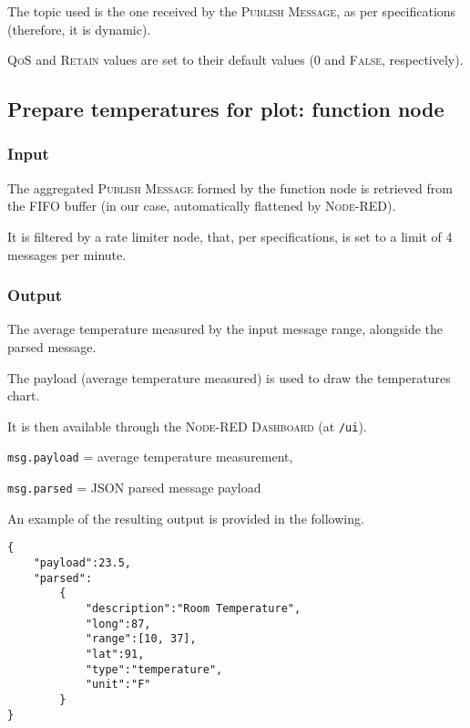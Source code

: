 \documentclass[a4paper,11pt]{article} %
\begin{document}
    The topic used is the one received by the \textsc{Publish Message}, as per specifications (therefore, it is dynamic).

    \smallskip

    \textsc{QoS} and \textsc{Retain} values are set to their default values (\textsc{0} and \textsc{False}, respectively).

    \subsection{Prepare temperatures for plot: function node}\label{subsec:prepare-temperatures-for-plot:-function-node}

    \subsubsection{Input}

    The aggregated \textsc{Publish Message} formed by the function node is retrieved from the FIFO buffer (in our case, automatically flattened by \textsc{Node-RED}).

    \smallskip

    It is filtered by a rate limiter node, that, per specifications, is set to a limit of 4 messages per minute.

    \subsubsection{Output}

    The average temperature measured by the input message range, alongside the parsed message.

    \smallskip

    The payload (average temperature measured) is used to draw the temperatures chart.

    \smallskip

    It is then available through the \textsc{Node-RED Dashboard} (at \texttt{/ui}).

    \smallskip

    \texttt{msg.payload} = average temperature measurement,

    \texttt{msg.parsed} = JSON parsed message payload

    \medskip

    An example of the resulting output is provided in the following.

    \begin{verbatim}
{
    "payload":23.5,
    "parsed":
        {
            "description":"Room Temperature",
            "long":87,
            "range":[10, 37],
            "lat":91,
            "type":"temperature",
            "unit":"F"
        }
}
    \end{verbatim}
\end{document}
